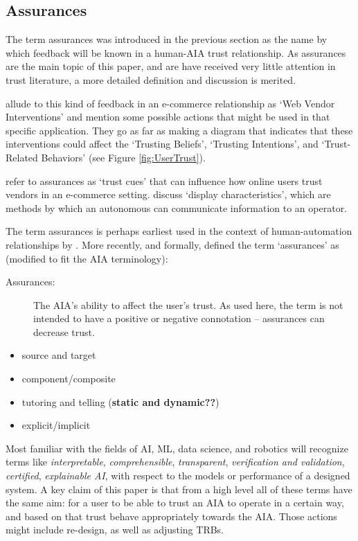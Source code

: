 \subsection{Assurances}
    The term assurances was introduced in the previous section as the name by which feedback will be known in a human-AIA trust relationship. As assurances are the main topic of this paper, and are have received very little attention in trust literature, a more detailed definition and discussion is merited.

    \citet{McKnight2001-fa} allude to this kind of feedback in an e-commerce relationship as `Web Vendor Interventions' and mention some possible actions that might be used in that specific application. They go as far as making a diagram that indicates that these interventions could affect the `Trusting Beliefs', `Trusting Intentions', and `Trust-Related Behaviors' (see Figure \ref{fig:UserTrust}).

    \citet{Corritore2003-gx} refer to assurances as `trust cues' that can influence how online users trust vendors in an e-commerce setting. \citet{Lee2004-pv} discuss `display characteristics', which are methods by which an autonomous can communicate information to an operator.
    
    The term assurances is perhaps earliest used in the context of human-automation relationships by \citet{Sheridan1984-kx}. More recently, and formally, \citet{Lillard2016-yg} defined the term `assurances' as (modified to fit the AIA terminology):
    
    \begin{description}
        \item [Assurances:] The AIA's ability to affect the user's trust. As used here, the term is not intended to have a positive or negative connotation -- assurances can decrease trust.
    \end{description}

    \begin{itemize}
        \item source and target
        \item component/composite
        \item tutoring and telling (\textbf{static and dynamic??})
        \item explicit/implicit
    \end{itemize}

    Most familiar with the fields of AI, ML, data science, and robotics will recognize terms like \emph{interpretable}, \emph{comprehensible}, \emph{transparent}, \emph{verification and validation}, \emph{certified}, \emph{explainable AI}, with respect to the models or performance of a designed system. A key claim of this paper is that from a high level all of these terms have the same aim: for a user to be able to trust an AIA to operate in a certain way, and based on that trust behave appropriately towards the AIA. Those actions might include re-design, as well as adjusting TRBs.

